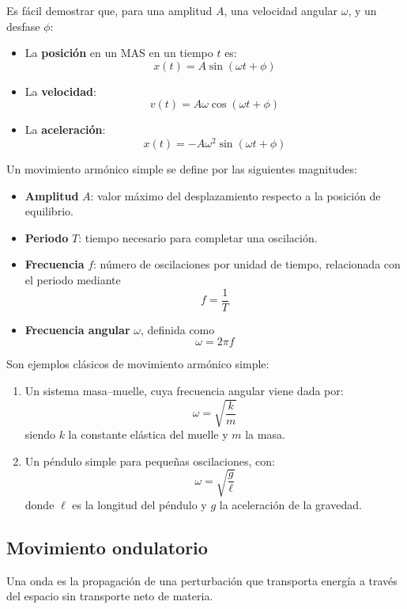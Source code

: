 \documentclass[10pt]{article}
\begin{document}
\begin{remark}
  Es fácil demostrar que, para una amplitud $ A $, una velocidad angular $ \omega $, y un desfase $ \phi $:
  \begin{itemize}
    \item La \textbf{posición} en un MAS en un tiempo $ t $ es:
      \[ x(t) = A\sin(\omega t + \phi) \]
    \item La \textbf{velocidad}:
      \[ v(t) = A\omega\cos(\omega t + \phi) \]
    \item La \textbf{aceleración}:
      \[ x(t) = -A\omega^2\sin(\omega t + \phi) \]
  \end{itemize}
\end{remark}

Un movimiento armónico simple se define por las siguientes magnitudes:
\begin{itemize}
  \item \textbf{Amplitud} $A$: valor máximo del desplazamiento respecto a la posición de equilibrio.
  \item \textbf{Periodo} $T$: tiempo necesario para completar una oscilación.
  \item \textbf{Frecuencia} $f$: número de oscilaciones por unidad de tiempo, relacionada con el periodo mediante
    \[ f = \frac{1}{T} \]
  \item \textbf{Frecuencia angular} $\omega$, definida como
    \[ \omega = 2\pi f \]
\end{itemize}

\begin{example}
  Son ejemplos clásicos de movimiento armónico simple:
  \begin{enumerate}
    \item Un sistema masa--muelle, cuya frecuencia angular viene dada por:
      \[ \omega = \sqrt{\frac{k}{m}} \]
      siendo $k$ la constante elástica del muelle y $m$ la masa.
    \item Un péndulo simple para pequeñas oscilaciones, con:
      \[ \omega = \sqrt{\frac{g}{\ell}} \]
      donde $\ell$ es la longitud del péndulo y $g$ la aceleración de la gravedad.
  \end{enumerate}
\end{example}

\subsection{Movimiento ondulatorio}

\begin{definition}[Onda]
  Una onda es la propagación de una perturbación que transporta energía a través del espacio sin transporte neto de materia.
\end{definition}
\end{document}
